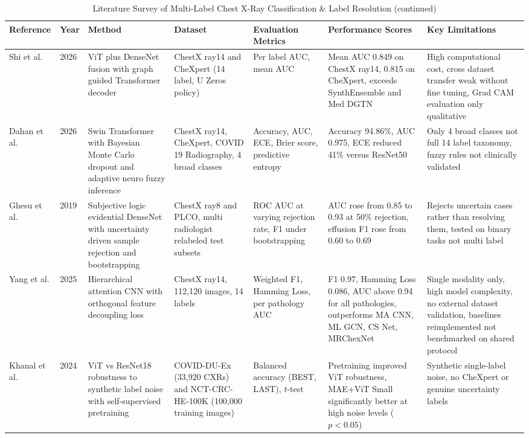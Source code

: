 \documentclass[conference]{IEEEtran}
\begin{document}
\begin{table}[!t]
\centering
\addtocounter{table}{-1}
\caption{Literature Survey of Multi-Label Chest X-Ray Classification \& Label Resolution (continued)}
\scriptsize
\renewcommand{\arraystretch}{1.1}
\setlength{\tabcolsep}{3pt}
\begin{tabular}{P{0.09}P{0.04}P{0.18}P{0.15}P{0.11}P{0.18}P{0.15}}
\toprule
\textbf{Reference} & \textbf{Year} & \textbf{Method} & \textbf{Dataset} & \textbf{Evaluation Metrics} & \textbf{Performance Scores} & \textbf{Key Limitations} \\
\midrule
Shi et al. \cite{ref10} & 2026 & ViT plus DenseNet fusion with graph guided Transformer decoder & ChestX ray14 and CheXpert (14 label, U Zeros policy) & Per label AUC, mean AUC & Mean AUC 0.849 on ChestX ray14, 0.815 on CheXpert, exceeds SynthEnsemble and Med DGTN & High computational cost, cross dataset transfer weak without fine tuning, Grad CAM evaluation only qualitative \\
\midrule
Dahan et al. \cite{ref11} & 2026 & Swin Transformer with Bayesian Monte Carlo dropout and adaptive neuro fuzzy inference & ChestX ray14, CheXpert, COVID 19 Radiography, 4 broad classes & Accuracy, AUC, ECE, Brier score, predictive entropy & Accuracy 94.86\%, AUC 0.975, ECE reduced 41\% versus ResNet50 & Only 4 broad classes not full 14 label taxonomy, fuzzy rules not clinically validated \\
\midrule
Ghesu et al. \cite{ref12} & 2019 & Subjective logic evidential DenseNet with uncertainty driven sample rejection and bootstrapping & ChestX ray8 and PLCO, multi radiologist relabeled test subsets & ROC AUC at varying rejection rate, F1 under bootstrapping & AUC rose from 0.85 to 0.93 at 50\% rejection, effusion F1 rose from 0.60 to 0.69 & Rejects uncertain cases rather than resolving them, tested on binary tasks not multi label \\
\midrule
Yang et al. \cite{ref13} & 2025 & Hierarchical attention CNN with orthogonal feature decoupling loss & ChestX ray14, 112,120 images, 14 labels & Weighted F1, Hamming Loss, per pathology AUC & F1 0.97, Hamming Loss 0.086, AUC above 0.94 for all pathologies, outperforms MA CNN, ML GCN, CS Net, MRChexNet & Single modality only, high model complexity, no external dataset validation, baselines reimplemented not benchmarked on shared protocol \\
\midrule
Khanal et al. \cite{ref14} & 2024 & ViT vs ResNet18 robustness to synthetic label noise with self-supervised pretraining & COVID-DU-Ex (33,920 CXRs) and NCT-CRC-HE-100K (100,000 training images) & Balanced accuracy (BEST, LAST), $t$-test & Pretraining improved ViT robustness, MAE+ViT Small significantly better at high noise levels ($p < 0.05$) & Synthetic single-label noise, no CheXpert or genuine uncertainty labels \\

\end{tabular}
\end{table}
\end{document}
